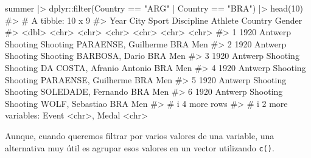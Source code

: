 \documentclass[
  letterpaper,
  DIV=11,
  numbers=noendperiod,
  oneside]{scrreprt}
\newenvironment{Shaded}{\begin{snugshade}}{\end{snugshade}}
\newcommand{\CommentTok}[1]{\textcolor[rgb]{0.37,0.37,0.37}{#1}}
\newcommand{\DecValTok}[1]{\textcolor[rgb]{0.68,0.00,0.00}{#1}}
\newcommand{\FunctionTok}[1]{\textcolor[rgb]{0.28,0.35,0.67}{#1}}
\newcommand{\NormalTok}[1]{\textcolor[rgb]{0.00,0.23,0.31}{#1}}
\newcommand{\SpecialCharTok}[1]{\textcolor[rgb]{0.37,0.37,0.37}{#1}}
\newcommand{\StringTok}[1]{\textcolor[rgb]{0.13,0.47,0.30}{#1}}
\begin{document}
\begin{Shaded}
\begin{Highlighting}[]
\NormalTok{summer }\SpecialCharTok{|\textgreater{}}\NormalTok{ dplyr}\SpecialCharTok{::}\FunctionTok{filter}\NormalTok{(Country }\SpecialCharTok{==} \StringTok{"ARG"} \SpecialCharTok{|}\NormalTok{ Country }\SpecialCharTok{==} \StringTok{"BRA"}\NormalTok{) }\SpecialCharTok{|\textgreater{}} \FunctionTok{head}\NormalTok{(}\DecValTok{10}\NormalTok{)}
\CommentTok{\#\textgreater{} \# A tibble: 10 x 9}
\CommentTok{\#\textgreater{}    Year City    Sport    Discipline Athlete                   Country Gender}
\CommentTok{\#\textgreater{}   \textless{}dbl\textgreater{} \textless{}chr\textgreater{}   \textless{}chr\textgreater{}    \textless{}chr\textgreater{}      \textless{}chr\textgreater{}                     \textless{}chr\textgreater{}   \textless{}chr\textgreater{} }
\CommentTok{\#\textgreater{} 1  1920 Antwerp Shooting Shooting   PARAENSE, Guilherme       BRA     Men   }
\CommentTok{\#\textgreater{} 2  1920 Antwerp Shooting Shooting   BARBOSA, Dario            BRA     Men   }
\CommentTok{\#\textgreater{} 3  1920 Antwerp Shooting Shooting   DA COSTA, Afranio Antonio BRA     Men   }
\CommentTok{\#\textgreater{} 4  1920 Antwerp Shooting Shooting   PARAENSE, Guilherme       BRA     Men   }
\CommentTok{\#\textgreater{} 5  1920 Antwerp Shooting Shooting   SOLEDADE, Fernando        BRA     Men   }
\CommentTok{\#\textgreater{} 6  1920 Antwerp Shooting Shooting   WOLF, Sebastiao           BRA     Men   }
\CommentTok{\#\textgreater{} \# i 4 more rows}
\CommentTok{\#\textgreater{} \# i 2 more variables: Event \textless{}chr\textgreater{}, Medal \textless{}chr\textgreater{}}
\end{Highlighting}
\end{Shaded}

Aunque, cuando queremos filtrar por varios valores de una variable, una
alternativa muy útil es agrupar esos valores en un vector utilizando
\texttt{c()}.
\end{document}
